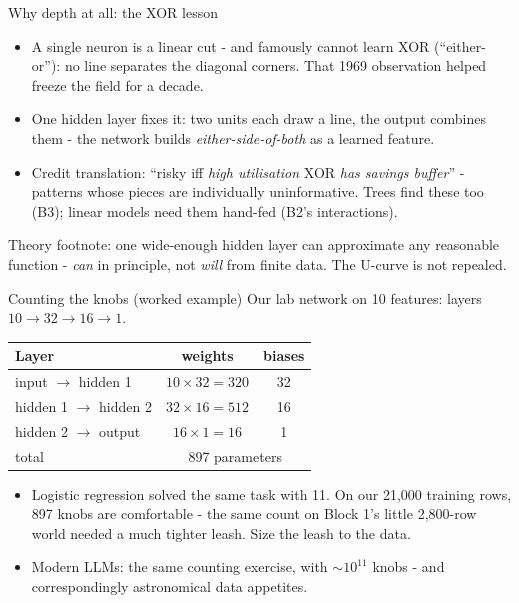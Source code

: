 \documentclass[10pt,aspectratio=169]{beamer}
\begin{document}
\begin{frame}{Why depth at all: the XOR lesson}
  \begin{itemize}
    \item A single neuron is a linear cut - and famously \alert{cannot
          learn XOR} (``either-or''): no line separates the diagonal
          corners. That 1969 observation helped freeze the field for a
          decade.
    \item One hidden layer fixes it: two units each draw a line, the
          output combines them - the network builds
          \emph{either-side-of-both} as a \alert{learned feature}.
    \item Credit translation: ``risky iff \emph{high utilisation} XOR
          \emph{has savings buffer}'' - patterns whose pieces are
          individually uninformative. Trees find these too (B3);
          linear models need them hand-fed (B2's interactions).
  \end{itemize}
  \vspace{0.4em}
  \begin{center}\small
    Theory footnote: one wide-enough hidden layer can approximate any
    reasonable function - \emph{can} in principle, not \emph{will} from
    finite data. The U-curve is not repealed.
  \end{center}
\end{frame}

\begin{frame}{Counting the knobs (worked example)}
  Our lab network on 10 features: layers $10 \to 32 \to 16 \to 1$.
  \begin{center}\small
  \begin{tabular}{@{}lcc@{}}
    \toprule
    Layer & weights & biases \\
    \midrule
    input $\to$ hidden 1 & $10 \times 32 = 320$ & 32 \\
    hidden 1 $\to$ hidden 2 & $32 \times 16 = 512$ & 16 \\
    hidden 2 $\to$ output & $16 \times 1 = 16$ & 1 \\
    \midrule
    total & \multicolumn{2}{c}{\alert{897 parameters}} \\
    \bottomrule
  \end{tabular}
  \end{center}
  \vspace{0.4em}
  \begin{itemize}\small
    \item Logistic regression solved the same task with \alert{11}.
          On our 21{,}000 training rows, 897 knobs are comfortable -
          the same count on Block 1's little 2{,}800-row world needed a
          much tighter leash. Size the leash to the data.
    \item Modern LLMs: the same counting exercise, with $\sim$$10^{11}$
          knobs - and correspondingly astronomical data appetites.
  \end{itemize}
\end{frame}
\end{document}
